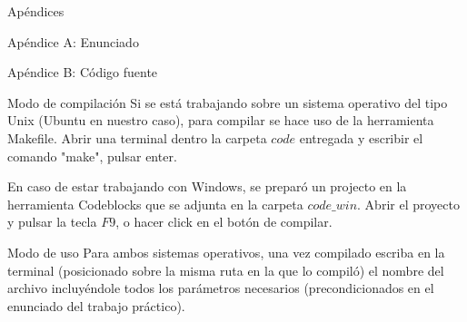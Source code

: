 \begin{section}{Apéndices}
	\begin{subsection}{Apéndice A: Enunciado}
		
	\end{subsection}
	\begin{subsection}{Apéndice B: Código fuente}
		\begin{subsection}{Modo de compilación}
			Si se está trabajando sobre un sistema operativo del tipo Unix (Ubuntu en nuestro caso), para compilar se hace uso de la herramienta Makefile.			
			Abrir una terminal dentro la carpeta $code$ entregada y escribir el comando "make", pulsar enter.
			
			En caso de estar trabajando con Windows, se preparó un projecto en la herramienta Codeblocks que se adjunta en la carpeta $code\_win$.
			Abrir el proyecto y pulsar la tecla $F9$, o hacer click en el botón de compilar.
		\end{subsection}	
		\begin{subsection}{Modo de uso}
			Para ambos sistemas operativos, una vez compilado escriba en la terminal (posicionado sobre la misma ruta en la que lo compiló) el nombre del archivo incluyéndole todos los parámetros necesarios (precondicionados en el enunciado del trabajo práctico).
		\end{subsection}	
	\end{subsection}	
\end{section}

